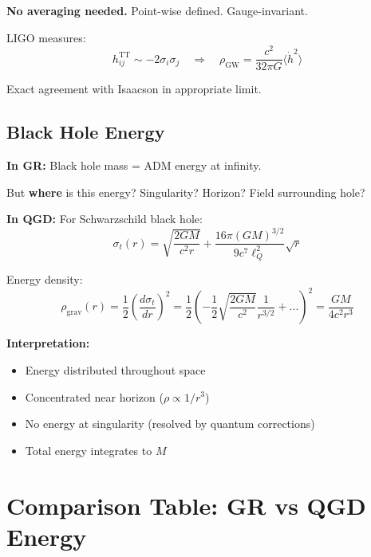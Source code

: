 \documentclass[11pt,a4paper]{article}
\theoremstyle{definition}
\theoremstyle{remark}
\begin{document}
	\textbf{No averaging needed.} Point-wise defined. Gauge-invariant.
	
	LIGO measures:
	\begin{equation}
		h_{ij}^{\text{TT}} \sim -2\sigma_i\sigma_j \quad \Rightarrow \quad \rho_{\text{GW}} = \frac{c^2}{32\pi G}\langle\dot{h}^2\rangle
	\end{equation}
	
	Exact agreement with Isaacson in appropriate limit.
	
	\subsection{Black Hole Energy}
	
	\textbf{In GR:} Black hole mass = ADM energy at infinity.
	
	But \textbf{where} is this energy? Singularity? Horizon? Field surrounding hole?
	
	\textbf{In QGD:} For Schwarzschild black hole:
	\begin{equation}
		\sigma_t(r) = \sqrt{\frac{2GM}{c^2r}} + \frac{16\pi(GM)^{3/2}}{9c^7\ell_Q^2}\sqrt{r}
	\end{equation}
	
	Energy density:
	\begin{equation}
		\rho_{\text{grav}}(r) = \frac{1}{2}\left(\frac{d\sigma_t}{dr}\right)^2 = \frac{1}{2}\left(-\frac{1}{2}\sqrt{\frac{2GM}{c^2}}\frac{1}{r^{3/2}} + ...\right)^2 = \frac{GM}{4c^2r^3}
	\end{equation}
	
	\textbf{Interpretation:}
	\begin{itemize}
		\item Energy distributed throughout space
		\item Concentrated near horizon ($\rho \propto 1/r^3$)
		\item No energy at singularity (resolved by quantum corrections)
		\item Total energy integrates to $M$
	\end{itemize}
	
	\section{Comparison Table: GR vs QGD Energy}
	
\end{document}
